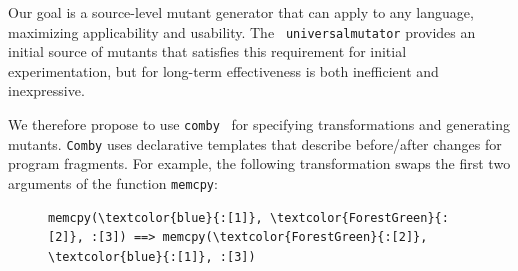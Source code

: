 Our goal is a source-level mutant generator that can apply to any language,
maximizing applicability and usability.  
 The {\tt
  universalmutator} provides an initial source of mutants that
satisfies this requirement for initial experimentation, but for
long-term effectiveness is both inefficient and inexpressive.  



We therefore propose to use {\tt comby}~\cite{comby-github, rvt-ppc} for specifying
transformations and generating mutants. {\tt Comby} uses
declarative templates that describe before/after changes for program fragments. For example, the following transformation swaps the first two arguments of the function {\tt memcpy}:

\begin{figure}[!h]
\centering
\begin{BVerbatim}[commandchars=\\\{\}]
memcpy(\textcolor{blue}{:[1]}, \textcolor{ForestGreen}{:[2]}, :[3]) ==> memcpy(\textcolor{ForestGreen}{:[2]}, \textcolor{blue}{:[1]}, :[3])
\end{BVerbatim}
\end{figure}

